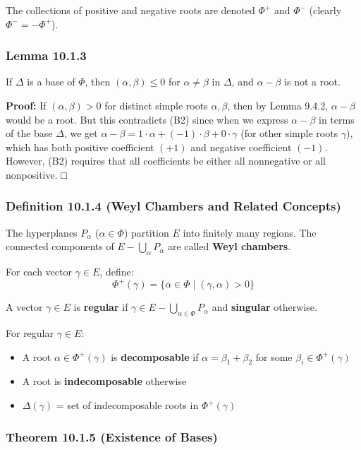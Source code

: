 The collections of positive and negative roots are denoted $\Phi^+$ and $\Phi^-$ (clearly $\Phi^- = -\Phi^+$).

\subsubsection{Lemma 10.1.3}

If $\Delta$ is a base of $\Phi$, then $(\alpha, \beta) \leq 0$ for $\alpha \neq \beta$ in $\Delta$, and $\alpha - \beta$ is not a root.

\textbf{Proof:}
If $(\alpha, \beta) > 0$ for distinct simple roots $\alpha, \beta$, then by Lemma 9.4.2, $\alpha - \beta$ would be a root. But this contradicts (B2) since when we express $\alpha - \beta$ in terms of the base $\Delta$, we get $\alpha - \beta = 1 \cdot \alpha + (-1) \cdot \beta + 0 \cdot \gamma$ (for other simple roots $\gamma$), which has both positive coefficient $(+1)$ and negative coefficient $(-1)$. However, (B2) requires that all coefficients be either all nonnegative or all nonpositive. □

\subsubsection{Definition 10.1.4 (Weyl Chambers and Related Concepts)}

The hyperplanes $P_\alpha$ ($\alpha \in \Phi$) partition $E$ into finitely many regions. The connected components of $E - \bigcup_\alpha P_\alpha$ are called \textbf{Weyl chambers}.

For each vector $\gamma \in E$, define:
\[
\Phi^+(\gamma) = \{\alpha \in \Phi \mid (\gamma, \alpha) > 0\}
\]

A vector $\gamma \in E$ is \textbf{regular} if $\gamma \in E - \bigcup_{\alpha \in \Phi} P_\alpha$ and \textbf{singular} otherwise.

For regular $\gamma \in E$:

\begin{itemize}
	\item A root $\alpha \in \Phi^+(\gamma)$ is \textbf{decomposable} if $\alpha = \beta_1 + \beta_2$ for some $\beta_i \in \Phi^+(\gamma)$
	\item A root is \textbf{indecomposable} otherwise
	\item $\Delta(\gamma)$ = set of indecomposable roots in $\Phi^+(\gamma)$
\end{itemize}

\subsubsection{Theorem 10.1.5 (Existence of Bases)}

